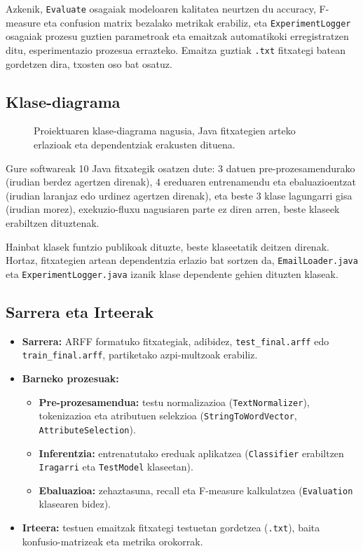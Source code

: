 \documentclass[12pt, a4paper]{article}
\begin{document}
Azkenik, \texttt{Evaluate} osagaiak modeloaren kalitatea neurtzen du accuracy, F-measure eta confusion matrix bezalako metrikak erabiliz, eta \texttt{ExperimentLogger} osagaiak prozesu guztien parametroak eta emaitzak automatikoki erregistratzen ditu, esperimentazio prozesua errazteko. Emaitza guztiak \texttt{.txt} fitxategi batean gordetzen dira, txosten oso bat osatuz.

\subsection{Klase-diagrama}

\begin{figure}[H]
    \centering
    
    \caption{Proiektuaren klase-diagrama nagusia, Java fitxategien arteko erlazioak eta dependentziak erakusten dituena.}
    \label{fig:klase-diagrama}
\end{figure}
Gure softwareak 10 Java fitxategik osatzen dute: 3 datuen pre-prozesamendurako (irudian berdez agertzen direnak), 4 ereduaren entrenamendu eta ebaluazioentzat (irudian laranjaz edo urdinez agertzen direnak), eta beste 3 klase lagungarri gisa (irudian morez), exekuzio-fluxu nagusiaren parte ez diren arren, beste klaseek erabiltzen dituztenak.

Hainbat klasek funtzio publikoak dituzte, beste klaseetatik deitzen direnak. Hortaz, fitxategien artean dependentzia erlazio bat sortzen da, \texttt{EmailLoader.java} eta \texttt{ExperimentLogger.java} izanik klase dependente gehien dituzten klaseak.


\subsection{Sarrera eta Irteerak}

\begin{itemize}
    \item \textbf{Sarrera:} ARFF formatuko fitxategiak, adibidez, \texttt{test\_final.arff} edo \texttt{train\_final.arff}, partiketako azpi-multzoak erabiliz.
    \item \textbf{Barneko prozesuak:}
    \begin{itemize}
        \item \textbf{Pre-prozesamendua:} testu normalizazioa (\texttt{TextNormalizer}), tokenizazioa eta atributuen selekzioa (\texttt{StringToWordVector}, \texttt{AttributeSelection}).
        \item \textbf{Inferentzia:} entrenatutako ereduak aplikatzea (\texttt{Classifier} erabiltzen \texttt{Iragarri} eta \texttt{TestModel} klaseetan).
        \item \textbf{Ebaluazioa:} zehaztasuna, recall eta F-measure kalkulatzea (\texttt{Evaluation} klasearen bidez).
    \end{itemize}
    \item \textbf{Irteera:} testuen emaitzak fitxategi testuetan gordetzea (\texttt{.txt}), baita konfusio-matrizeak eta metrika orokorrak.
\end{itemize}
\end{document}

